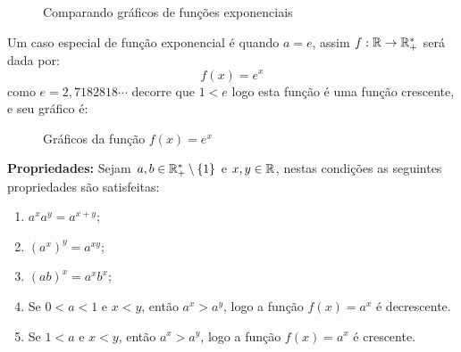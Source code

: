   \begin{figure}[H]
 \centering
    \caption{Comparando gráficos de funções exponenciais}
  \end{figure}


  \begin{exem} \label{ex:exp-e}
  Um caso especial de função exponencial é quando $a= e$, assim $f: \mathbb{R} \rightarrow \mathbb{R}_{+}^{*} $ será dada por:
  \[f(x) = e^x\]
  como $e= 2,7182818 \cdots$ decorre que $1 < e$ logo esta função é uma função crescente, e seu gráfico é:

  \begin{figure}[H]
 \centering
    \caption{Gráficos da função $f(x)= e^x$}
  \end{figure}
  \end{exem}

 \textbf{Propriedades:} Sejam $a, b \in \mathbb{R}_{+}^{*} \setminus \{1\}$ e $x, y \in \mathbb{R}$, nestas condições as seguintes propriedades são satisfeitas:
 \begin{enumerate}
  \item $a^x a^y= a^{x+y}$;
  \item $(a^x)^y= a^{xy}$;
  \item $(ab)^x= a^x b^x$;
  \item Se $0 < a < 1$ e $x < y$, então $a^x > a^y$, logo a função $f(x)= a^x$ é decrescente.
  \item Se $1 < a$ e $x < y$, então $a^x > a^y$, logo a função $f(x)= a^x$ é crescente.
 \end{enumerate}

